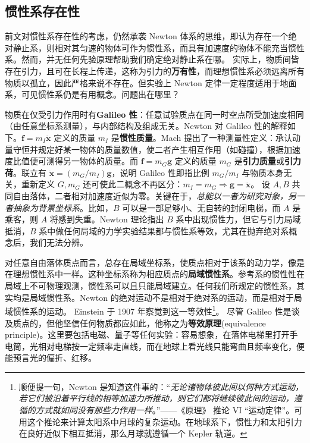 \subsection{惯性系存在性}

前文对惯性系存在性的考虑，仍然承袭 Newton 体系的思维，即认为存在一个绝对静止系，则相对其匀速的物体可作为惯性系，而具有加速度的物体不能充当惯性系。然而，并无任何先验原理帮助我们确定绝对静止系在哪。
实际上，物质间皆存在引力，且可在长程上传递，这称为引力的\textbf{万有性}，而理想惯性系必须远离所有物质以孤立，因此严格来说不存在。但实验上 Newton 定律一定程度适用于地面系，可见惯性系仍是有用概念。问题出在哪里？

物质在仅受引力作用时有\textbf{Galileo 性}：任意试验质点在同一时空点所受加速度相同（由任意坐标系测量），与内部结构及组成无关。Newton 对 Galileo 性的解释如下。$\bm f=m_I\ddot{\bm x}$ 定义的质量 $m_I$ 是\textbf{惯性质量}。Mach 提出了一种测量性定义：承认动量守恒并规定好某一物体的质量数值，使二者产生相互作用（如碰撞），根据加速度比值便可测得另一物体的质量。而 $\bm f=m_G\bm g $ 定义的质量 $m_G$ 是\textbf{引力质量}或\textbf{引力荷}。联立有 $\ddot{\bm x}=(m_G/m_I)\bm g $，说明 Galileo 性即指比例 $m_G/m_I$ 与物质本身无关，重新定义 $G,m_G$ 还可使此二概念不再区分：$m_I=m_G\Rightarrow\bm g =\ddot{\bm x}$。
设 $A,B$ 共同自由落体，二者相对加速度近似为零。关键在于，\textit{总能以一者为研究对象，另一者抽象为背景坐标系}。比如，$B$ 可以是一部足够小、无自转的封闭电梯，而 $A$ 是乘客，则 $A$ 将感到失重。Newton 理论指出 $B$ 系中出现惯性力，但它与引力局域抵消，$B$ 系中做任何局域的力学实验结果都与惯性系等效，尤其在抛弃绝对系概念后，我们无法分辨。

对任意自由落体质点而言，总存在局域坐标系，使质点相对于该系的动力学，像是在理想惯性系中一样。这种坐标系称为相应质点的\textbf{局域惯性系}。参考系的惯性性在局域上不可物理观测，惯性系可以且只能局域建立。任何我们所规定的惯性系，其实均是局域惯性系。Newton 的绝对运动不是相对于绝对系的运动，而是相对于局域惯性系的运动。
Einstein 于 1907 年察觉到这一等效性\footnote{顺便提一句，Newton 是知道这件事的：“\textit{无论诸物体彼此间以何种方式运动，若它们被沿着平行线的相等加速力所推动，则它们都将继续彼此间的运动，遵循的方式就如同没有那些力作用一样}。”——《原理》\cite{Principia} 推论 VI “运动定律”。可用这个推论来计算太阳系中月球的复杂运动。在地球系下，惯性力和太阳引力在良好近似下相互抵消，那么月球就遵循一个 Kepler 轨道。}。
尽管 Galileo 性是谈及质点的，但他坚信任何物质都应如此，他称之为\textbf{等效原理}(equivalence principle)。这里要包括电磁、量子等任何实验：容易想象，在落体电梯里打开手电筒，光相对电梯按一定频率走直线，而在地球上看光线只能弯曲且频率变化，便能预言光的偏折、红移。

